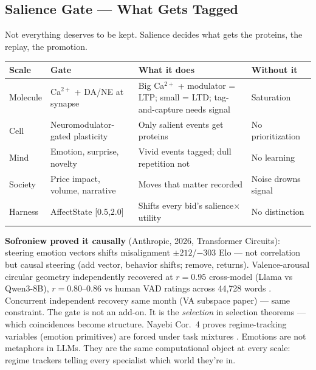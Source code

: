 \documentclass[11pt]{article}
\begin{document}
\subsection{Salience Gate --- What Gets Tagged}

Not everything deserves to be kept. Salience decides what gets the proteins, the replay, the promotion.

\begin{center}
\small
\begin{tabular}{p{2.4cm}p{3.6cm}p{5.0cm}p{2.4cm}}
\toprule
Scale & Gate & What it does & Without it \\
\midrule
Molecule & Ca$^{2+}$ + DA/NE at synapse & Big Ca$^{2+}$ + modulator = LTP; small = LTD; tag-and-capture needs signal & Saturation \\
Cell & Neuromodulator-gated plasticity & Only salient events get proteins & No prioritization \\
Mind & Emotion, surprise, novelty & Vivid events tagged; dull repetition not & No learning \\
Society & Price impact, volume, narrative & Moves that matter recorded & Noise drowns signal \\
Harness & AffectState [0.5,2.0] & Shifts every bid's salience$\times$utility & No distinction \\
\bottomrule
\end{tabular}
\end{center}

\textbf{Sofroniew proved it causally} \citep{sofroniew2026} (Anthropic, 2026, Transformer Circuits): steering emotion vectors shifts misalignment $\pm212$/$-303$ Elo --- not correlation but causal steering (add vector, behavior shifts; remove, returns). Valence-arousal circular geometry independently recovered at $r=0.95$ cross-model (Llama vs Qwen3-8B), $r=0.80$--0.86 vs human VAD ratings across 44,728 words \citep{sofroniew2026}. Concurrent independent recovery same month (VA subspace paper) --- same constraint. The gate is not an add-on. It is the \emph{selection} in selection theorems --- which coincidences become structure. Nayebi Cor.~4 proves regime-tracking variables (emotion primitives) are forced under task mixtures \citep{nayebi2026}. Emotions are not metaphors in LLMs. They are the same computational object at every scale: regime trackers telling every specialist which world they're in.
\end{document}
